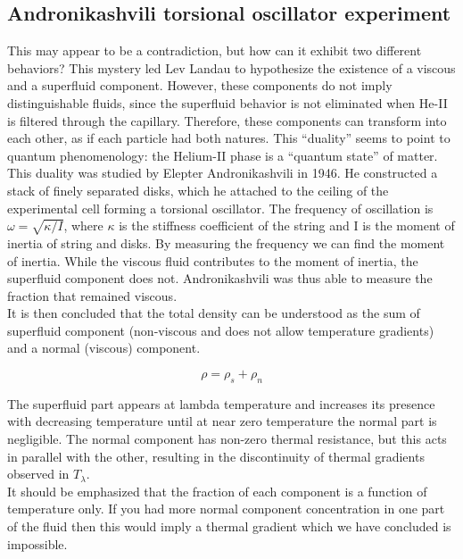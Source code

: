 \documentclass{article}
\begin{document}
\subsection{Andronikashvili torsional oscillator experiment}

This may appear to be a contradiction, but how can it exhibit two different behaviors? This mystery led Lev Landau to hypothesize the existence of a viscous and a superfluid component. However, these components do not imply distinguishable fluids, since the superfluid behavior is not eliminated when He-II is filtered through the capillary. Therefore, these components can transform into each other, as if each particle had both natures. This “duality” seems to point to quantum phenomenology: the Helium-II phase is a “quantum state” of matter.
\\

This duality was studied by Elepter Andronikashvili in 1946. He constructed a stack of finely separated disks, which he attached to the ceiling of the experimental cell forming a torsional oscillator. The frequency of oscillation is $\omega = \sqrt{\kappa/I}$, where $\kappa$ is the stiffness coefficient of the string and I is the moment of inertia of string and disks. By measuring the frequency we can find the moment of inertia. While the viscous fluid contributes to the moment of inertia, the superfluid component does not. Andronikashvili was thus able to measure the fraction that remained viscous.
\\

It is then concluded that the total density can be understood as the sum of superfluid component (non-viscous and does not allow temperature gradients) and a normal (viscous) component.

\[\rho = \rho_s + \rho_n\]

The superfluid part appears at lambda temperature and increases its presence with decreasing temperature until at near zero temperature the normal part is negligible. The normal component has non-zero thermal resistance, but this acts in parallel with the other, resulting in the discontinuity of thermal gradients observed in $T_\lambda$.
\\

It should be emphasized that the fraction of each component is a function of temperature only. If you had more normal component concentration in one part of the fluid then this would imply a thermal gradient which we have concluded is impossible.
\\
\end{document}
